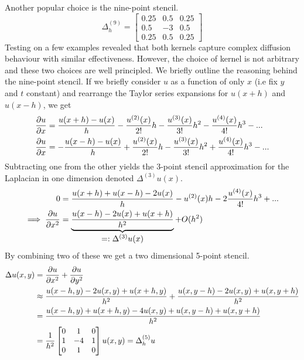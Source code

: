 Another popular choice is the nine-point stencil\cite{rosser1975nine}.
\[
  \Delta^{(9)}_h = \begin{bmatrix}
    0.25 & 0.5 & 0.25\\
    0.5 & -3 & 0.5\\
    0.25 & 0.5 & 0.25
  \end{bmatrix}
\]
Testing on a few examples revealed that both kernels capture complex diffusion behaviour with similar effectiveness. However, the choice of kernel is not arbitrary and these two choices are well principled. We briefly outline the reasoning behind the nine-point stencil. If we briefly consider $u$ as a function of only $x$ (i.e fix $y$ and $t$ constant) and rearrange the Taylor series expansions for $u(x+h)$ and $u(x-h)$, we get
\begin{align*}
  \pdv{u}{x} &= \frac{u(x+h) - u(x)}{h} - \frac{u^{(2)}(x)}{2!}h - \frac{u^{(3)}(x)}{3!}h^2 - \frac{u^{(4)}(x)}{4!}h^3 - ... \\
  \pdv{u}{x} &= - \frac{u(x-h) - u(x)}{h} + \frac{u^{(2)}(x)}{2!}h - \frac{u^{(3)}(x)}{3!}h^2 + \frac{u^{(4)}(x)}{4!}h^3 - ...
\end{align*}
Subtracting one from the other yields the 3-point stencil approximation for the Laplacian in one dimension denoted $\Delta^{(3)}u(x)$.
\begin{align*}
  0 &= \frac{u(x+h) + u(x-h) - 2u(x)}{h} - u^{(2)}(x)h - 2\frac{u^{(4)}(x)}{4!}h^3 + ...\\
  \implies \pdv{u}{x^2} &=  \underbrace{\frac{u(x-h) -2u(x) + u(x+h)}{h^2}}_{\let\scriptstyle\textstyle
  \substack{=: \Delta^{(3)}u(x)}} + O(h^2)
\end{align*}
By combining two of these we get a two dimensional 5-point stencil.
\begin{align*}
  \Delta u(x, y) &= \pdv{u}{x^2} + \pdv{u}{y^2}\\
                     &\approx \frac{u(x-h, y) -2u(x, y) + u(x+h, y)}{h^2} + \frac{u(x, y-h) -2u(x, y) + u(x, y+h)}{h^2}\\
                     &= \frac{u(x-h, y)+ u(x+h, y) -4u(x, y) + u(x, y-h) + u(x, y+h)}{h^2}\\
                     &= \frac{1}{h^2} \begin{bmatrix}
                                0 & 1 & 0\\
                                1 & -4 & 1\\
                                0 & 1 & 0
                     \end{bmatrix} u(x, y) = \Delta^{(5)}_h u
\end{align*}

